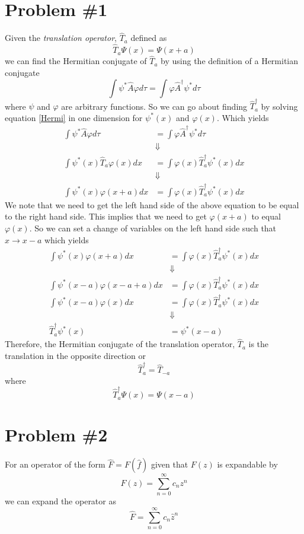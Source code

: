 \documentclass[11pt]{article}
\numberwithin{equation}{section}
\begin{document}


\section{Problem \#1}
Given the \emph{translation operator}, $\hat{T}_a$ defined as
$$\hat{T}_a\Psi(x) = \Psi(x+a)$$
we can find the Hermitian conjugate of $\hat{T}_a$ by using the definition of a Hermitian 
conjugate
\begin{equation}
\int\psi^*\hat{A}\varphi d\tau = \int\varphi\hat{A}^{\dagger}\psi^* d\tau
\label{Hermi}
\end{equation}
where $\psi$ and $\varphi$ are arbitrary functions. So we can go about finding
$\hat{T}_a^{\dagger}$ by solving equation \ref{Hermi} in one dimension for $\psi^*(x)$ and
$\varphi(x)$. Which yields
\begin{align*}
\int\psi^*\hat{A}\varphi d\tau &= \int\varphi\hat{A}^{\dagger}\psi^* d\tau\\
&\Downarrow\\
\int\psi^*(x)\hat{T}_a\varphi(x)dx &= \int\varphi(x)\hat{T}_a^{\dagger}\psi^*(x) dx\\
&\Downarrow\\
\int\psi^*(x)\varphi(x+a)dx &= \int\varphi(x)\hat{T}_a^{\dagger}\psi^*(x) dx
\end{align*}
We note that we need to get the left hand side of the above equation to be equal to the right
hand side. This implies that we need to get $\varphi(x+a)$ to equal $\varphi(x)$. So we can 
set a change of variables on the left hand side such that $x\rightarrow x-a$ which yields
\begin{align*}
\int\psi^*(x)\varphi(x+a)dx &= \int\varphi(x)\hat{T}_a^{\dagger}\psi^*(x) dx\\
&\Downarrow\\
\int\psi^*(x-a)\varphi(x-a+a)dx &= \int\varphi(x)\hat{T}_a^{\dagger}\psi^*(x) dx\\
\int\psi^*(x-a)\varphi(x)dx &= \int\varphi(x)\hat{T}_a^{\dagger}\psi^*(x) dx\\
&\Downarrow\\
\hat{T}_a^{\dagger}\psi^*(x) &= \psi^*(x-a)
\end{align*}
Therefore, the Hermitian conjugate of the translation operator, $\hat{T}_a$ is the 
translation in the opposite direction or
$$\hat{T}_a^{\dagger} = \hat{T}_{-a}$$ 
where
$$\hat{T}_a^{\dagger}\Psi(x) = \Psi(x-a)$$

\pagebreak

\section{Problem \#2}
For an operator of the form $\hat{F} = F\left(\hat{f}\right)$ given that $F(z)$ is expandable
by 
$$F(z) = \sum_{n=0}^{\infty}c_nz^n$$
we can expand the operator as
\begin{equation}
\hat{F} = \sum_{n=0}^{\infty}c_n\hat{z}^n
\label{OperExpand}
\end{equation}
\end{document}
